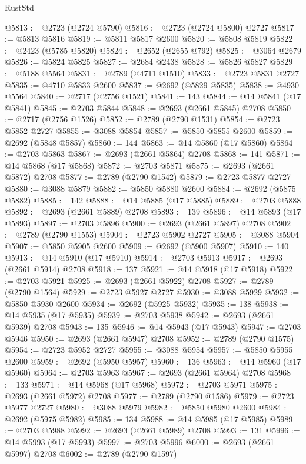 \begin{lexlean}{RustStd}
\begin{coremodule}
@5813 := @2723 (@2724 @5790)
@5816 := @2723 (@2724 @5800) @2727
@5817 := @5813 @5816
@5819 := @5811 @5817 @2600
@5820 := @5808 @5819
@5822 := @2423 (@5785 @5820)
@5824 := @2652 (@2655 @792)
@5825 := @3064 @2679
@5826 := @5824 @5825
@5827 := @2684 @2438
@5828 := @5826 @5827
@5829 := @5188 @5564
@5831 := @2789 (@4711 @1510)
@5833 := @2723 @5831 @2727
@5835 := @4710 @5833 @2600
@5837 := @2692 (@5829 @5835)
@5838 := @4930 @5564
@5840 := @2717 (@2756 @1521)
@5841 := 143
@5844 := @14 @5841 (@17 @5841)
@5845 := @2703 @5844
@5848 := @2693 (@2661 @5845) @2708
@5850 := @2717 (@2756 @1526)
@5852 := @2789 (@2790 @1531)
@5854 := @2723 @5852 @2727
@5855 := @3088 @5854
@5857 := @5850 @5855 @2600
@5859 := @2692 (@5848 @5857)
@5860 := 144
@5863 := @14 @5860 (@17 @5860)
@5864 := @2703 @5863
@5867 := @2693 (@2661 @5864) @2708
@5868 := 141
@5871 := @14 @5868 (@17 @5868)
@5872 := @2703 @5871
@5875 := @2693 (@2661 @5872) @2708
@5877 := @2789 (@2790 @1542)
@5879 := @2723 @5877 @2727
@5880 := @3088 @5879
@5882 := @5850 @5880 @2600
@5884 := @2692 (@5875 @5882)
@5885 := 142
@5888 := @14 @5885 (@17 @5885)
@5889 := @2703 @5888
@5892 := @2693 (@2661 @5889) @2708
@5893 := 139
@5896 := @14 @5893 (@17 @5893)
@5897 := @2703 @5896
@5900 := @2693 (@2661 @5897) @2708
@5902 := @2789 (@2790 @1553)
@5904 := @2723 @5902 @2727
@5905 := @3088 @5904
@5907 := @5850 @5905 @2600
@5909 := @2692 (@5900 @5907)
@5910 := 140
@5913 := @14 @5910 (@17 @5910)
@5914 := @2703 @5913
@5917 := @2693 (@2661 @5914) @2708
@5918 := 137
@5921 := @14 @5918 (@17 @5918)
@5922 := @2703 @5921
@5925 := @2693 (@2661 @5922) @2708
@5927 := @2789 (@2790 @1564)
@5929 := @2723 @5927 @2727
@5930 := @3088 @5929
@5932 := @5850 @5930 @2600
@5934 := @2692 (@5925 @5932)
@5935 := 138
@5938 := @14 @5935 (@17 @5935)
@5939 := @2703 @5938
@5942 := @2693 (@2661 @5939) @2708
@5943 := 135
@5946 := @14 @5943 (@17 @5943)
@5947 := @2703 @5946
@5950 := @2693 (@2661 @5947) @2708
@5952 := @2789 (@2790 @1575)
@5954 := @2723 @5952 @2727
@5955 := @3088 @5954
@5957 := @5850 @5955 @2600
@5959 := @2692 (@5950 @5957)
@5960 := 136
@5963 := @14 @5960 (@17 @5960)
@5964 := @2703 @5963
@5967 := @2693 (@2661 @5964) @2708
@5968 := 133
@5971 := @14 @5968 (@17 @5968)
@5972 := @2703 @5971
@5975 := @2693 (@2661 @5972) @2708
@5977 := @2789 (@2790 @1586)
@5979 := @2723 @5977 @2727
@5980 := @3088 @5979
@5982 := @5850 @5980 @2600
@5984 := @2692 (@5975 @5982)
@5985 := 134
@5988 := @14 @5985 (@17 @5985)
@5989 := @2703 @5988
@5992 := @2693 (@2661 @5989) @2708
@5993 := 131
@5996 := @14 @5993 (@17 @5993)
@5997 := @2703 @5996
@6000 := @2693 (@2661 @5997) @2708
@6002 := @2789 (@2790 @1597)

\end{coremodule}
\end{lexlean}
